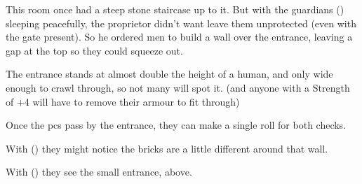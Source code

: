 \begin{exampletext}
  This room once had a steep stone staircase up to it.
  But with the guardians () sleeping peacefully, the proprietor didn't want leave them unprotected (even with the gate present).
  So he ordered men to build a wall over the entrance, leaving a gap at the top so they could squeeze out.
\end{exampletext}

The entrance stands at almost double the height of a human, and only wide enough to crawl through, so not many will spot it.
(and anyone with a Strength of +4 will have to remove their armour to fit through)

Once the \glspl{pc} pass by the entrance, they can make a single roll for both checks.

With  (\tn[14]) they might notice the bricks are a little different around that wall.

With  (\tn[12]) they see the small entrance, above.

